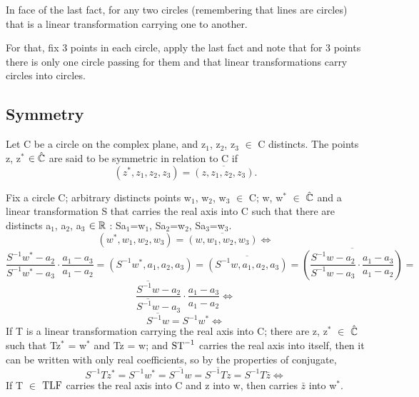 \begin{fato}
In face of the last fact, for any two circles (remembering that lines are circles) that is a linear transformation carrying one to another.

For that, fix 3 points in each circle, apply the last fact and note that for 3 points there is only one circle passing for them and that linear transformations carry circles into circles.
\end{fato}

\subsection{Symmetry}

\begin{definicao}
Let C be a circle on the complex plane, and z$_1$, z$_2$, z$_3$ $\in$ C distincts. The points z, z$^{*}$ $\in \hat{\mathbb{C}}$  are said to be symmetric in relation to C if
\begin{equation*}(z^{*}, z_1, z_2, z_3) = \overline{(z, z_1, z_2, z_3)}.
\end{equation*}
\end{definicao}

\begin{obs}
Fix a circle C; arbitrary distincts points w$_1$, w$_2$, w$_3$ $\in$ C; w, w$^{*}$ $\in$ $\hat{\mathbb{C}}$ and a linear transformation S that carries the real axis into C such that there are distincts a$_1$, a$_2$, a$_3$ $\in \mathbb{R}$ : Sa$_1$=w$_1$, Sa$_2$=w$_2$, Sa$_3$=w$_3$.
\begin{equation*}
    (w^{*}, w_1, w_2, w_3) = \overline{(w, w_1, w_2, w_3)}\Leftrightarrow
\end{equation*}    
\begin{equation*}
    \frac{S^{-1}w^{*}-a_2}{S^{-1}w^{*}-a_3} \cdot \frac{a_1-a_3}{a_1-a_2} = (S^{-1}w^{*}, a_1, a_2, a_3) = \overline{(S^{-1}w, a_1, a_2, a_3)} = \overline{\left(\frac{S^{-1}w-a_2}{S^{-1}w-a_3} \cdot \frac{a_1-a_3}{a_1-a_2}\right)} =
\end{equation*}
\begin{equation*}
    \frac{\overline{S^{-1}w}-a_2}{\overline{S^{-1}w}-a_3} \cdot \frac{a_1-a_3}{a_1-a_2} \Leftrightarrow
\end{equation*}
\begin{equation*}
    \overline{S^{-1}w} = S^{-1}w^{*} \Leftrightarrow    
\end{equation*}
If T is a linear transformation carrying the real axis into C; there are z, z$^{*}$ $\in$ $\hat{\mathbb{C}}$ such that Tz$^*$ = w$^*$ and Tz = w; and $\operatorname{ST}^{-1}$ carries the real axis into itself, then it can be written with only real coefficients, so by the properties of conjugate,
\begin{equation*}
    S^{-1}Tz^{*} = S^{-1}w^{*} = \overline{S^{-1}w} = \overline{S^{-1}Tz} = S^{-1}T\bar{z}
\Leftrightarrow 
\end{equation*}
If T $\in$ $\operatorname{TLF}$ carries the real axis into C and z into w, then carries $\bar{z}$ into w$^{*}$.
\end{obs}

